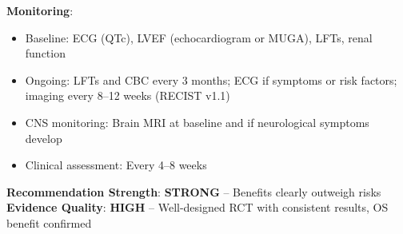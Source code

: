 \documentclass[10pt,letterpaper]{article}
\begin{document}
\begin{tcolorbox}[enhanced,colback=stronggreen!10,colframe=stronggreen,
title={\textbf{Option 1: Osimertinib Monotherapy} \hfill \colorbox{white}{\textbf{STRONG (1A)}}},
fonttitle=\bfseries\small,coltitle=black]
{\textbf{Monitoring}:
\begin{itemize}
\item Baseline: ECG (QTc), LVEF (echocardiogram or MUGA), LFTs, renal function
\item Ongoing: LFTs and CBC every 3 months; ECG if symptoms or risk factors; imaging every 8--12 weeks (RECIST v1.1)
\item CNS monitoring: Brain MRI at baseline and if neurological symptoms develop
\item Clinical assessment: Every 4--8 weeks
\end{itemize}

\textbf{Recommendation Strength}: \textbf{STRONG} -- Benefits clearly outweigh risks\\
\textbf{Evidence Quality}: \textbf{HIGH} -- Well-designed RCT with consistent results, OS benefit confirmed
}
\end{tcolorbox}

\vspace{3pt}
\end{document}
